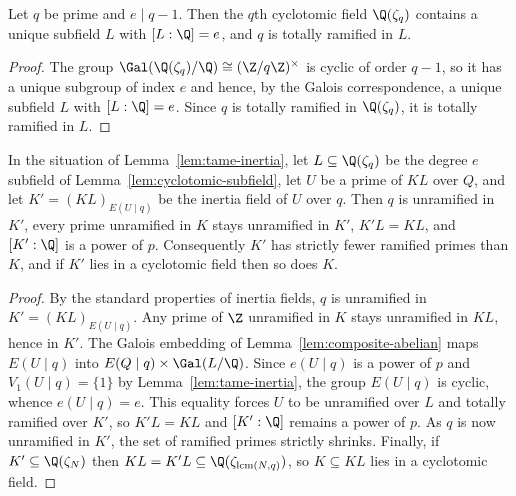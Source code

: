 \begin{lemma}
  \label{lem:cyclotomic-subfield}
  Let $q$ be prime and $e \mid q - 1$. Then the $q$th cyclotomic field
  $\Q(\zeta_q)$ contains a unique subfield $L$ with $[L : \Q] = e$, and $q$ is
  totally ramified in $L$.
\end{lemma}
\begin{proof}
  The group $\Gal(\Q(\zeta_q)/\Q) \cong (\Z/q\Z)^\times$ is cyclic of order
  $q - 1$, so it has a unique subgroup of index $e$ and hence, by the Galois
  correspondence, a unique subfield $L$ with $[L : \Q] = e$. Since $q$ is
  totally ramified in $\Q(\zeta_q)$, it is totally ramified in $L$.
\end{proof}

\begin{lemma}
  \label{lem:inertia-field}
  In the situation of Lemma~\ref{lem:tame-inertia}, let $L \subseteq \Q(\zeta_q)$
  be the degree $e$ subfield of Lemma~\ref{lem:cyclotomic-subfield}, let $U$ be
  a prime of $KL$ over $Q$, and let $K' = (KL)_{E(U \mid q)}$ be the inertia
  field of $U$ over $q$. Then $q$ is unramified in $K'$, every prime unramified
  in $K$ stays unramified in $K'$, $K'L = KL$, and $[K' : \Q]$ is a power of
  $p$. Consequently $K'$ has strictly fewer ramified primes than $K$, and if
  $K'$ lies in a cyclotomic field then so does $K$.
\end{lemma}
\begin{proof}
  By the standard properties of inertia fields, $q$ is unramified in
  $K' = (KL)_{E(U \mid q)}$. Any prime of $\Z$ unramified in $K$ stays
  unramified in $KL$, hence in $K'$. The Galois embedding of
  Lemma~\ref{lem:composite-abelian} maps $E(U \mid q)$ into
  $E(Q \mid q) \times \Gal(L/\Q)$. Since $e(U \mid q)$ is a power of $p$ and
  $V_1(U \mid q) = \{1\}$ by Lemma~\ref{lem:tame-inertia}, the group
  $E(U \mid q)$ is cyclic, whence $e(U \mid q) = e$. This equality forces $U$
  to be unramified over $L$ and totally ramified over $K'$, so $K'L = KL$ and
  $[K' : \Q]$ remains a power of $p$. As $q$ is now unramified in $K'$, the set
  of ramified primes strictly shrinks. Finally, if $K' \subseteq \Q(\zeta_N)$
  then $KL = K'L \subseteq \Q(\zeta_{\operatorname{lcm}(N,q)})$, so
  $K \subseteq KL$ lies in a cyclotomic field.
\end{proof}


